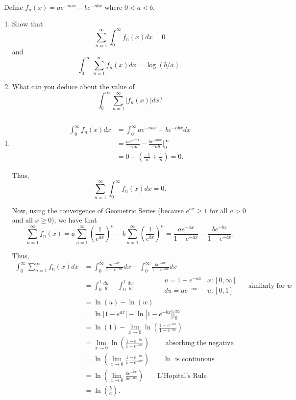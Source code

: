 \documentclass[12pt]{Qual}
\begin{document}
\begin{problem} $\,$
Define $f_n(x)=ae^{-nax}-be^{-nbx}$ where $0<a<b$.
\begin{enumerate}[label=(\alph*)]
    \item Show that $$\sum_{n=1}^\infty\int_0^\infty f_n(x)dx=0$$ and $$\int_0^\infty\sum_{n=1}^\infty f_n(x)dx=\log(b/a).$$
    \item What can you deduce about the value of $$\int_0^\infty\sum_{n=1}^\infty|f_n(x)|dx?$$
\end{enumerate}
\end{problem}


\begin{solution}$\,$
\begin{enumerate}[label=(\alph*)]
    \item \begin{align*}
        \int_0^\infty f_n(x)dx&=\int_0^\infty ae^{-nax}-be^{-nbx}dx\\
        &=\frac{ae^{-nax}}{-na}-\frac{be^{-nbx}}{-nb}\bigg|_0^\infty\\
        &=0-\left(\frac{-1}{n}+\frac{1}{n}\right)=0.
    \end{align*}

    Thus, $$\sum_{n=1}^\infty\int_0^\infty f_n(x)dx=0.$$

    Now, using the convergence of Geometric Series (because $e^{ax}\ge1$ for all $a>0$ and all $x\ge0$), we have that $$\sum_{n=1}^\infty f_n(x)=a\sum_{n=1}^\infty\left(\frac{1}{e^{ax}}\right)^n-b\sum_{n=1}^\infty\left(\frac{1}{e^{bx}}\right)^n=\frac{ae^{-ax}}{1-e^{-ax}}-\frac{be^{-bx}}{1-e^{-bx}}.$$

    Thus, \begin{align*}
        \int_0^\infty\sum_{n=1}^\infty f_n(x)dx&=\int_0^\infty\frac{ae^{-ax}}{1-e^{-ax}}dx-\int_0^\infty\frac{be^{-bx}}{1-e^{-bx}}dx\\
        &=\int_0^1\frac{du}{u}-\int_0^1\frac{dw}{w}\qquad\qquad \begin{matrix}
    u=1-e^{-ax} &   x:[0,\infty]\\
    du=ae^{-ax} & u:[0,1]
\end{matrix}\quad\text{ similarly for }w\\
        &=\ln(u)-\ln(w)\\
        &=\ln|1-e^{ax}|-\ln|1-e^{-bx}|\bigg|_0^\infty\\
        &=\ln(1)-\lim_{x\to0}\ln\left(\frac{1-e^{-ax}}{1-e^{-bx}}\right)\\
        &=\lim_{x\to0}\ln\left(\frac{1-e^{-bx}}{1-e^{-ax}}\right)\qquad\text{ absorbing the negative}\\
        &=\ln\left(\lim_{x\to0}\frac{1-e^{-bx}}{1-e^{-ax}}\right)\qquad\ln \text{ is continuous}\\
        &=\ln\left(\lim_{x\to0}\frac{be^{-bx}}{ae^{-ax}}\right)\qquad\text{L'Hopital's Rule}\\
        &=\ln\left(\frac{b}{a}\right).
    \end{align*}


\end{enumerate}
\end{solution}
\end{document}
